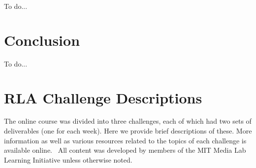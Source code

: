 \documentclass[12pt,twoside,vi]{mitthesis}
\newcommand{\wip}[1]{{\color{red} To do...}}
\begin{document}
\wip{Frame around tensions, for each broad set of interactions go over "what did it look like", "how did it work", and "how well did it work"}

\chapter{Conclusion}

\wip{narrative summary of thesis, an honest set of personal takeaways (from which reader can judge whether to replicate work) and feeligns about future work}

\appendix

\chapter{RLA Challenge Descriptions}

The online course was divided into three challenges, each of which had two sets of deliverables (one for each week). Here we provide brief descriptions of these. More information as well as various resources related to the topics of each challenge is available online.~\cite{rla} All content was developed by members of the MIT Media Lab Learning Initiative unless otherwise noted.
\end{document}
